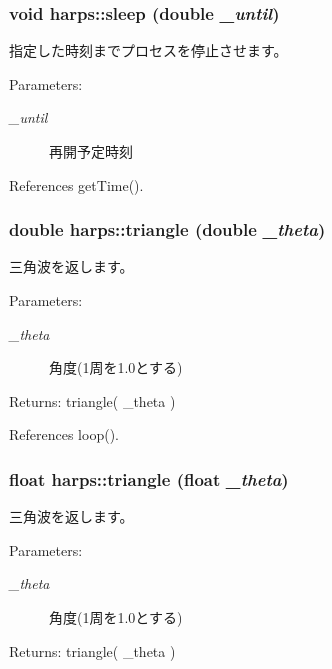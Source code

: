 \subsubsection[sleep]{\setlength{\rightskip}{0pt plus 5cm}void harps::sleep (double {\em \_\-until})\hspace{0.3cm}{\tt  [inline]}}\label{namespaceharps_7ddb3dd742346b37c7027671e7878792}


指定した時刻までプロセスを停止させます。 \begin{Desc}
\item[Parameters:]
\begin{description}
\item[{\em \_\-until}]再開予定時刻 \end{description}
\end{Desc}


References getTime().
\subsubsection[triangle]{\setlength{\rightskip}{0pt plus 5cm}double harps::triangle (double {\em \_\-theta})\hspace{0.3cm}{\tt  [inline]}}\label{namespaceharps_59471afc6a4b9fda2abad9ef125c6245}


三角波を返します。 \begin{Desc}
\item[Parameters:]
\begin{description}
\item[{\em \_\-theta}]角度(1周を1.0とする) \end{description}
\end{Desc}
\begin{Desc}
\item[Returns:]triangle( \_\-theta ) \end{Desc}


References loop().
\subsubsection[triangle]{\setlength{\rightskip}{0pt plus 5cm}float harps::triangle (float {\em \_\-theta})\hspace{0.3cm}{\tt  [inline]}}\label{namespaceharps_521c0226ca004e6f0942eebbcd706fb0}


三角波を返します。 \begin{Desc}
\item[Parameters:]
\begin{description}
\item[{\em \_\-theta}]角度(1周を1.0とする) \end{description}
\end{Desc}
\begin{Desc}
\item[Returns:]triangle( \_\-theta ) \end{Desc}


